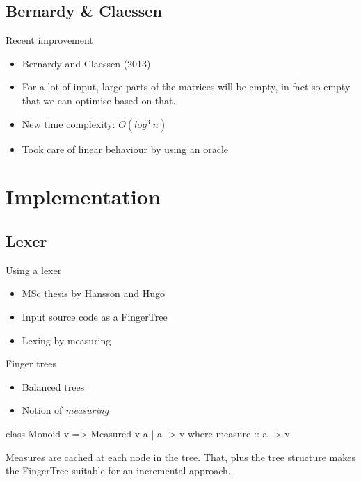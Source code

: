 \documentclass{beamer}
\begin{document}
\subsection{Bernardy \& Claessen}
\begin{frame}{Recent improvement}
    \begin{itemize}
        \item Bernardy and Claessen (2013)
        \item For a lot of input, large parts of the matrices will be empty, in
              fact so empty that we can optimise based on that.
        \item New time complexity: $O(log^3\ n)$
        \item Took care of linear behaviour by using an oracle
    \end{itemize}
\end{frame}

\section{Implementation}

\subsection{Lexer}
\begin{frame}{Using a lexer}
    \begin{itemize}
        \item MSc thesis by Hansson and Hugo
        \item Input source code as a FingerTree
        \item Lexing by measuring
    \end{itemize}
\end{frame}

\begin{frame}[fragile]{Finger trees}
    \begin{itemize}
        \item Balanced trees
        \item Notion of \textit{measuring}
    \end{itemize}

    \begin{code}
    class Monoid v => Measured v a | a -> v where
        measure :: a -> v
    \end{code}

    Measures are cached at each node in the tree. That, plus the tree structure
    makes the FingerTree suitable for an incremental approach. 
\end{frame}
\end{document}
